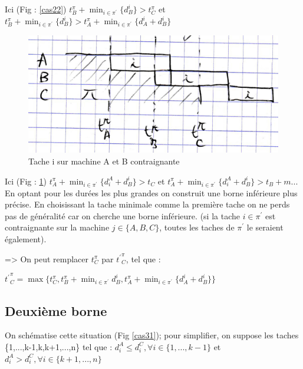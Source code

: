 \documentclass[12pt]{article}
\begin{document}
Ici (Fig : \ref{cas22}) $t_B^\pi + \displaystyle\min_{i \in \pi^\prime}\{d_B^i\} > t_C^\pi$ et $t_B^\pi + \displaystyle\min_{i \in \pi^\prime}\{d_B^i\} > t_A^\pi + \displaystyle\min_{i \in \pi^\prime}\{d_A^i + d_B^i\}$


\begin{figure}[!ht]
\centering
\centerline{\includegraphics[scale=1]{9.jpg}}
\caption{Tache i sur machine A et B contraignante}
\label{cas23}
\end{figure}

Ici (Fig : \ref{cas23}) $t_A^\pi + \displaystyle\min_{i \in \pi^\prime}\{d_i^A + d_B^i\} > t_C$ et $t_A^\pi + \displaystyle\min_{i \in \pi^\prime}\{d_i^A + d_B^i\} > t_B + m...$ \\

En optant pour les durées les plus grandes on construit une borne inférieure plus précise. En choisissant la tache minimale comme la première tache on ne perds pas de généralité car on cherche une borne inférieure. (si la tache $i\in\pi^\prime$ est contraignante sur la machine $j\in\{A,B,C\}$, toutes les taches de $\pi^\prime$ le seraient également).

=> On peut remplacer $t_C^\pi$ par ${t^\prime}_C^\pi$, tel que :\\
\begin{center}
${t^\prime}_C^\pi = \max\{t_C^\pi,t_B^\pi + \displaystyle\min_{i \in \pi^\prime} d_B^i, t_A^\pi + \displaystyle\min_{i \in \pi^\prime}\{d_A^i + d_B^i\}\}$
\end{center}

\subsection{Deuxième borne}

On schématise cette situation (Fig \ref{cas31}); pour simplifier, on suppose les taches \{1,...,k-1,k,k+1,...,n\} tel que : $d_i^A \le d_i^C, \forall i \in \{1,...,k-1\}$ et $d_i^A > d_i^C, \forall i \in \{k+1,...,n\}$
\end{document}
